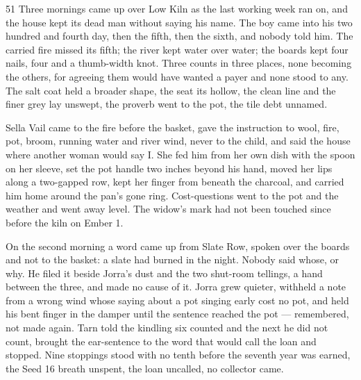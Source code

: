 
\scenebreak


\scenebreak


\scenebreak

\CRtailpiece
\begin{CRchronicle}{51}
Three mornings came up over Low Kiln as the last working week ran on, and the house kept its dead man without saying his name. The boy came into his two hundred and fourth day, then the fifth, then the sixth, and nobody told him. The carried fire missed its fifth; the river kept water over water; the boards kept four nails, four and a thumb-width knot. Three counts in three places, none becoming the others, for agreeing them would have wanted a payer and none stood to any. The salt coat held a broader shape, the seat its hollow, the clean line and the finer grey lay unswept, the proverb went to the pot, the tile debt unnamed.

Sella Vail came to the fire before the basket, gave the instruction to wool, fire, pot, broom, running water and river wind, never to the child, and said the house where another woman would say I. She fed him from her own dish with the spoon on her sleeve, set the pot handle two inches beyond his hand, moved her lips along a two-gapped row, kept her finger from beneath the charcoal, and carried him home around the pan’s gone ring. Cost-questions went to the pot and the weather and went away level. The widow’s mark had not been touched since before the kiln on Ember 1.

On the second morning a word came up from Slate Row, spoken over the boards and not to the basket: a slate had burned in the night. Nobody said whose, or why. He filed it beside Jorra’s dust and the two shut-room tellings, a hand between the three, and made no cause of it. Jorra grew quieter, withheld a note from a wrong wind whose saying about a pot singing early cost no pot, and held his bent finger in the damper until the sentence reached the pot --- remembered, not made again. Tarn told the kindling six counted and the next he did not count, brought the ear-sentence to the word that would call the loan and stopped. Nine stoppings stood with no tenth before the seventh year was earned, the Seed 16 breath unspent, the loan uncalled, no collector came.


\end{CRchronicle}

